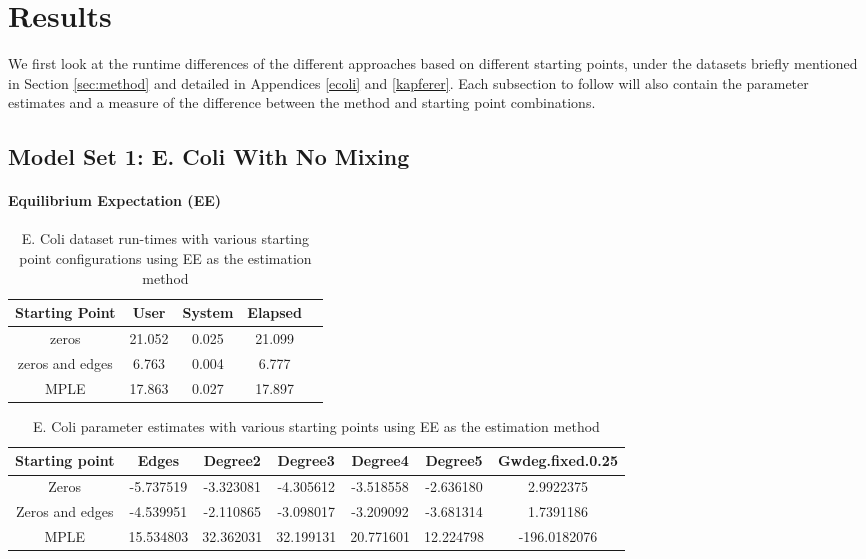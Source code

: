 \section{Results}
\label{sec:results}

We first look at the runtime differences of the different approaches based on different starting points, under the datasets briefly mentioned in Section \ref{sec:method} and detailed in Appendices \ref{ecoli} and \ref{kapferer}. Each subsection to follow will also contain the parameter estimates and a measure of the difference between the method and starting point combinations.

\subsection{Model Set 1: E. Coli With No Mixing}

\paragraph{Equilibrium Expectation (EE)}

\begin{table}[H]
 \centering
 \begin{tabular}{||c | c | c | c | c||} 
 \hline
 Starting Point & User & System & Elapsed \\
 \hline\hline
 zeros & 21.052 & 0.025 & 21.099 \\ 
 \hline
 zeros and edges & 6.763 & 0.004 & 6.777 \\
 \hline
 MPLE & 17.863 & 0.027 & 17.897 \\
 \hline
 \end{tabular}
 \label{t:ecoli1_ee}
 \caption{E. Coli dataset run-times with various starting point configurations using EE as the estimation method}
\end{table}

\begin{table}[H]
\centering
\scriptsize
\begin{tabular}{|| c | c | c | c | c | c | c ||}
\hline
Starting point & Edges & Degree2 & Degree3 & Degree4 & Degree5 & Gwdeg.fixed.0.25 \\
\hline
Zeros & -5.737519 & -3.323081 & -4.305612 & -3.518558 & -2.636180 & 2.9922375 \\
\hline
Zeros and edges & -4.539951 &-2.110865 & -3.098017 & -3.209092 & -3.681314 & 1.7391186 \\
\hline
MPLE & 15.534803 & 32.362031 & 32.199131 & 20.771601 & 12.224798 & -196.0182076 \\
\hline
\end{tabular}
\label{t:params_ecoli_ee}
\caption{E. Coli parameter estimates with various starting points using EE as the estimation method}
\end{table}


